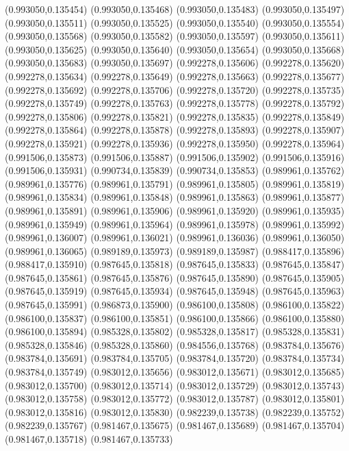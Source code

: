 (0.993050,0.135454)
(0.993050,0.135468)
(0.993050,0.135483)
(0.993050,0.135497)
(0.993050,0.135511)
(0.993050,0.135525)
(0.993050,0.135540)
(0.993050,0.135554)
(0.993050,0.135568)
(0.993050,0.135582)
(0.993050,0.135597)
(0.993050,0.135611)
(0.993050,0.135625)
(0.993050,0.135640)
(0.993050,0.135654)
(0.993050,0.135668)
(0.993050,0.135683)
(0.993050,0.135697)
(0.992278,0.135606)
(0.992278,0.135620)
(0.992278,0.135634)
(0.992278,0.135649)
(0.992278,0.135663)
(0.992278,0.135677)
(0.992278,0.135692)
(0.992278,0.135706)
(0.992278,0.135720)
(0.992278,0.135735)
(0.992278,0.135749)
(0.992278,0.135763)
(0.992278,0.135778)
(0.992278,0.135792)
(0.992278,0.135806)
(0.992278,0.135821)
(0.992278,0.135835)
(0.992278,0.135849)
(0.992278,0.135864)
(0.992278,0.135878)
(0.992278,0.135893)
(0.992278,0.135907)
(0.992278,0.135921)
(0.992278,0.135936)
(0.992278,0.135950)
(0.992278,0.135964)
(0.991506,0.135873)
(0.991506,0.135887)
(0.991506,0.135902)
(0.991506,0.135916)
(0.991506,0.135931)
(0.990734,0.135839)
(0.990734,0.135853)
(0.989961,0.135762)
(0.989961,0.135776)
(0.989961,0.135791)
(0.989961,0.135805)
(0.989961,0.135819)
(0.989961,0.135834)
(0.989961,0.135848)
(0.989961,0.135863)
(0.989961,0.135877)
(0.989961,0.135891)
(0.989961,0.135906)
(0.989961,0.135920)
(0.989961,0.135935)
(0.989961,0.135949)
(0.989961,0.135964)
(0.989961,0.135978)
(0.989961,0.135992)
(0.989961,0.136007)
(0.989961,0.136021)
(0.989961,0.136036)
(0.989961,0.136050)
(0.989961,0.136065)
(0.989189,0.135973)
(0.989189,0.135987)
(0.988417,0.135896)
(0.988417,0.135910)
(0.987645,0.135818)
(0.987645,0.135833)
(0.987645,0.135847)
(0.987645,0.135861)
(0.987645,0.135876)
(0.987645,0.135890)
(0.987645,0.135905)
(0.987645,0.135919)
(0.987645,0.135934)
(0.987645,0.135948)
(0.987645,0.135963)
(0.987645,0.135991)
(0.986873,0.135900)
(0.986100,0.135808)
(0.986100,0.135822)
(0.986100,0.135837)
(0.986100,0.135851)
(0.986100,0.135866)
(0.986100,0.135880)
(0.986100,0.135894)
(0.985328,0.135802)
(0.985328,0.135817)
(0.985328,0.135831)
(0.985328,0.135846)
(0.985328,0.135860)
(0.984556,0.135768)
(0.983784,0.135676)
(0.983784,0.135691)
(0.983784,0.135705)
(0.983784,0.135720)
(0.983784,0.135734)
(0.983784,0.135749)
(0.983012,0.135656)
(0.983012,0.135671)
(0.983012,0.135685)
(0.983012,0.135700)
(0.983012,0.135714)
(0.983012,0.135729)
(0.983012,0.135743)
(0.983012,0.135758)
(0.983012,0.135772)
(0.983012,0.135787)
(0.983012,0.135801)
(0.983012,0.135816)
(0.983012,0.135830)
(0.982239,0.135738)
(0.982239,0.135752)
(0.982239,0.135767)
(0.981467,0.135675)
(0.981467,0.135689)
(0.981467,0.135704)
(0.981467,0.135718)
(0.981467,0.135733)
